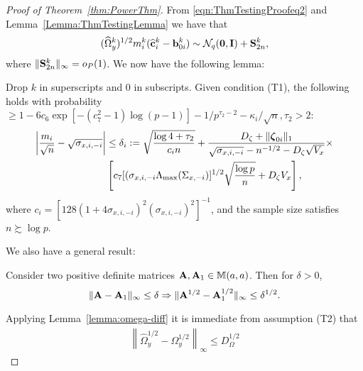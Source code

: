 \begin{proof}[Proof of Theorem~\ref{thm:PowerThm}]
From \eqref{eqn:ThmTestingProofeq2} and Lemma~\ref{Lemma:ThmTestingLemma} we have that
%
\begin{align}
(\widehat \Omega_y^k)^{1/2} m_i^k ( \widehat {{\bf{c}}}_i^k - {\bf{b}}_{0i}^k) \sim {\cal{N}}_q ({\bf 0}, {\mathbf{I}}) + {\mathbf{S}}_{2n}^k,
\end{align}
%
where $\| {\mathbf{S}}_{2n}^k \|_\infty = o_P(1)$. We now have the following lemma:
%
\begin{Lemma}\label{Lemma:PowerThmLemma}
Drop $k$ in superscripts and 0 in subscripts. Given condition (T1), the following holds with probability $\geq 1 - 6c_{6} \exp [-(c_{7}^2-1) \log (p-1)] - 1/p^{\tau_2-2} - \kappa_i / \sqrt n, \tau_2 > 2$:
%
\begin{align}
\left| \frac{m_i}{\sqrt n} - \sqrt{ \sigma_{x,i,-i}} \right| & \leq
\delta_i := \sqrt{ \frac{ \log 4 + \tau_2}{c_i n}} +
\frac{D_\zeta + \| {\boldsymbol{\zeta}}_{0i} \|_1 }{\sqrt{ \sigma_{x,i,-i}} - n^{-1/2} - D_\zeta \sqrt{V_x}} \times \notag\\
& \left[ c_{7} [(\sigma_{x,i,-i} \Lambda_{\max} (\Sigma_{x, -i})]^{1/2} \sqrt{ \frac{\log p}{n}} + D_\zeta V_x \right], \label{eqn:PowerThmLemmaEqn}
\end{align}
%
where $c_i = [ 128 (1 + 4 \sigma_{x,i,-i})^2 (\sigma_{x,i,-i})^2 ]^{-1}$, and the sample size satisfies $n \succsim \log p$.
\end{Lemma}
%

We also have a general result:

\begin{Lemma}\label{lemma:omega-diff}
Consider two positive definite matrices ${\mathbf{A}}, {\mathbf{A}}_1 \in {\mathbb{M}}(a,a)$. Then for $\delta > 0$,
%
$$
\| {\mathbf{A}}  -{\mathbf{A}}_1 \|_\infty \leq \delta \Rightarrow \| {\mathbf{A}}^{1/2} - {\mathbf{A}}_1^{1/2} \|_\infty \leq \delta^{1/2}.
$$
\end{Lemma}
%

\noindent Applying Lemma~\ref{lemma:omega-diff} it is immediate from assumption (T2) that
%
\begin{align}\label{eqn:omega-sqrt-bound}
\left\| \widehat \Omega_y^{1/2} - \Omega_y^{1/2} \right\|_\infty \leq D_{\Omega}^{1/2}
\end{align}


\end{proof}
